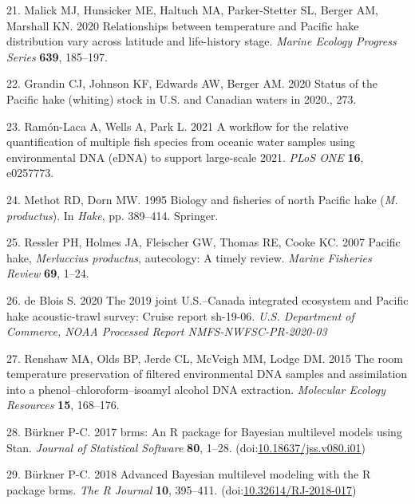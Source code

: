 \documentclass[
]{article}
\begin{document}
\leavevmode\hypertarget{ref-malick2020relationships}{}%
21. Malick MJ, Hunsicker ME, Haltuch MA, Parker-Stetter SL, Berger AM,
Marshall KN. 2020 Relationships between temperature and Pacific hake
distribution vary across latitude and life-history stage. \emph{Marine
Ecology Progress Series} \textbf{639}, 185--197.

\leavevmode\hypertarget{ref-grandin2020assessment}{}%
22. Grandin CJ, Johnson KF, Edwards AW, Berger AM. 2020 Status of the
Pacific hake (whiting) stock in U.S. and Canadian waters in 2020., 273.

\leavevmode\hypertarget{ref-ramon-laca2021PLOS}{}%
23. Ramón-Laca A, Wells A, Park L. 2021 A workflow for the relative
quantification of multiple fish species from oceanic water samples using
environmental DNA (eDNA) to support large-scale 2021. \emph{PLoS ONE}
\textbf{16}, e0257773.


\leavevmode\hypertarget{ref-methot1995biology}{}%
24. Methot RD, Dorn MW. 1995 Biology and fisheries of north Pacific hake
(\textit{M. productus}). In \emph{Hake}, pp. 389--414. Springer.


\leavevmode\hypertarget{ref-ressler2007pacific}{}%
25. Ressler PH, Holmes JA, Fleischer GW, Thomas RE, Cooke KC. 2007
Pacific hake, \textit{Merluccius productus}, autecology: A timely review.
\emph{Marine Fisheries Review} \textbf{69}, 1--24.

\leavevmode\hypertarget{ref-deBlois2020survey}{}%
26. de Blois S. 2020 The 2019 joint U.S.--Canada integrated ecosystem
and Pacific hake acoustic-trawl survey: Cruise report sh-19-06.
\emph{U.S. Department of Commerce, NOAA Processed Report
NMFS-NWFSC-PR-2020-03}

\leavevmode\hypertarget{ref-renshaw2015room}{}%
27. Renshaw MA, Olds BP, Jerde CL, McVeigh MM, Lodge DM. 2015 The room
temperature preservation of filtered environmental DNA samples and
assimilation into a phenol--chloroform--isoamyl alcohol DNA extraction.
\emph{Molecular Ecology Resources} \textbf{15}, 168--176.

\leavevmode\hypertarget{ref-brms2017}{}%
28. Bürkner P-C. 2017 brms: An R package for Bayesian multilevel models
using Stan. \emph{Journal of Statistical Software} \textbf{80}, 1--28.
(doi:\href{https://doi.org/10.18637/jss.v080.i01}{10.18637/jss.v080.i01})

\leavevmode\hypertarget{ref-brms2018}{}%
29. Bürkner P-C. 2018 Advanced Bayesian multilevel modeling with the R
package brms. \emph{The R Journal} \textbf{10}, 395--411.
(doi:\href{https://doi.org/10.32614/RJ-2018-017}{10.32614/RJ-2018-017})
\end{document}

